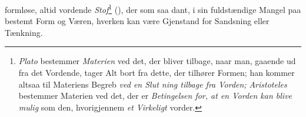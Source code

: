 formløse, altid vordende \emph{Stof}\footnote{\emph{Plato} bestemmer
\emph{Materien} ved det, der bliver tilbage, naar man,
gaaende ud fra det Vordende, tager Alt bort fra dette, der tilhører
Formen; han kommer altsaa til Materiens Begreb \emph{ved en Slut\-%
ning tilbage fra Vorden;} \emph{Aristoteles} bestemmer Materien
ved det, der er \emph{Betingelsen for, at en Vorden kan blive
mulig} som den, hvorigjennem \emph{et Virkeligt} vorder.} (),
der som saa\-%
dant, i sin fuldstændige Mangel paa bestemt Form og Væren,
hverken kan være Gjenstand for Sandsning eller Tænkning.

